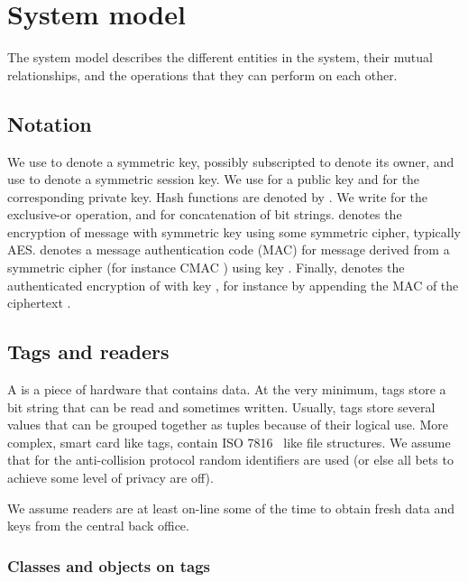 \section{System model}
\label{sec-model}

The system model describes the different entities in the system, their mutual
relationships, and the operations that they can perform on each other.

\subsection{Notation}

We use  to denote a symmetric key, possibly subscript\-ed to denote its
owner, and use  to denote a symmetric session key. 
We use  for a public key and  for the corresponding private key.
Hash functions are
denoted by . We write  for the exclusive-or operation, and
 for concatenation of bit strings.  denotes the encryption
of message  with symmetric key  using some symmetric cipher, typically
AES.  denotes a message authentication code (MAC) for message
 derived from
a symmetric cipher (for instance CMAC
\cite{NIST-PUB-800-38B,DBLP:conf/crypto/BlackR00}) using key .
Finally,  denotes the authenticated encryption of  with key
, for instance by appending the MAC of the ciphertext 
\cite{DBLP:conf/asiacrypt/BellareN00}.


\subsection{Tags and readers}

A   is a piece of hardware that contains data. 
At the very minimum, tags store a bit string that can be read and sometimes written. 
Usually, tags store several values that can be grouped together as tuples 
because of their logical use. More complex, smart card like tags, contain
ISO 7816~\cite{ISO7816} like file structures. We assume that for the anti-collision protocol random identifiers are used (or else all bets to achieve some level of privacy are off).

We assume readers are at least on-line some of the time to obtain fresh data and keys from the central back office.

\subsubsection{Classes and objects on tags}

